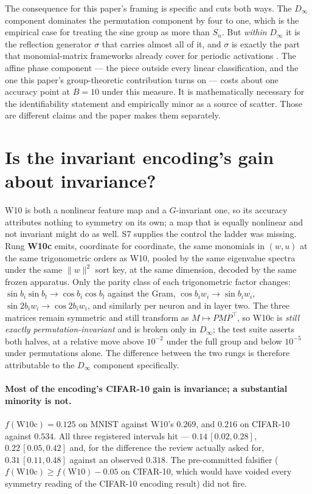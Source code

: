 \documentclass[10pt,letterpaper]{article}
\theoremstyle{definition}
\newcommand{\Dinf}{D_\infty}
\begin{document}
The consequence for this paper's framing is specific and cuts both ways. The $\Dinf$ component
dominates the permutation component by four to one, which is the empirical case for treating the
sine group as more than $S_n$. But \emph{within} $\Dinf$ it is the reflection generator $\sigma$
that carries almost all of it, and $\sigma$ is exactly the part that monomial-matrix frameworks
already cover for periodic activations \citep{tran2024monomial}. The affine phase component ---
the piece outside every linear classification, and the one this paper's group-theoretic
contribution turns on --- costs about one accuracy point at $B=10$ under this measure. It is
mathematically necessary for the identifiability statement and empirically minor as a source of
scatter. Those are different claims and the paper makes them separately.

\section{Is the invariant encoding's gain about invariance?}\label{sec:control}

W10 is both a nonlinear feature map and a $G$-invariant one, so its accuracy attributes nothing to
symmetry on its own; a map that is equally nonlinear and not invariant might do as well. S7 supplies
the control the ladder was missing. Rung \textbf{W10c} emits, coordinate for coordinate, the same
monomials in $(w,u)$ at the same trigonometric orders as W10, pooled by the same eigenvalue spectra
under the same $\|w\|^2$ sort key, at the same dimension, decoded by the same frozen apparatus. Only
the parity class of each trigonometric factor changes: $\sin b_i \sin b_l \to \cos b_i \cos b_l$
against the Gram, $\cos b_i w_i \to \sin b_i w_i$, $\sin 2b_i w_i \to \cos 2b_i w_i$, and similarly
per neuron and in layer two. The three matrices remain symmetric and still transform as
$M \mapsto PMP^\top$, so W10c is \emph{still exactly permutation-invariant} and is broken only in
$\Dinf$; the test suite asserts both halves, at a relative move above $10^{-2}$ under the full group
and below $10^{-5}$ under permutations alone. The difference between the two rungs is therefore
attributable to the $\Dinf$ component specifically.



\paragraph{Most of the encoding's CIFAR-10 gain is invariance; a substantial minority is not.}
$f(\mathrm{W10c}) = 0.125$ on MNIST against W10's $0.269$, and $0.216$ on CIFAR-10 against
$0.534$. All three registered intervals hit --- $0.14\,[0.02,0.28]$, $0.22\,[0.05,0.42]$ and, for
the difference the review actually asked for, $0.31\,[0.11,0.48]$ against an observed $0.318$. The
pre-committed falsifier ($f(\mathrm{W10c}) \ge f(\mathrm{W10}) - 0.05$ on CIFAR-10, which would
have voided every symmetry reading of the CIFAR-10 encoding result) did not fire.
\end{document}

